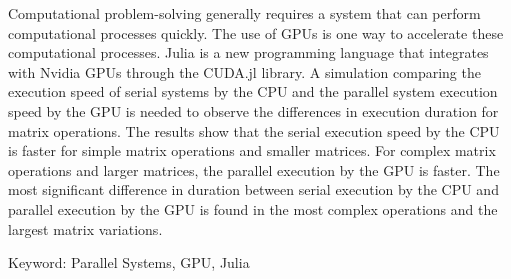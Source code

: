 \documentclass{skripsiactugm}
\begin{document}
\begin{abstracteng}

	Computational problem-solving generally requires a system that can perform computational processes quickly. The use of GPUs is one way to accelerate these computational processes. Julia is a new programming language that integrates with Nvidia GPUs through the CUDA.jl library. A simulation comparing the execution speed of serial systems by the CPU and the parallel system execution speed by the GPU is needed to observe the differences in execution duration for matrix operations. The results show that the serial execution speed by the CPU is faster for simple matrix operations and smaller matrices. For complex matrix operations and larger matrices, the parallel execution by the GPU is faster. The most significant difference in duration between serial execution by the CPU and parallel execution by the GPU is found in the most complex operations and the largest matrix variations.

	Keyword: Parallel Systems, GPU, Julia
\end{abstracteng}

\end{document}
